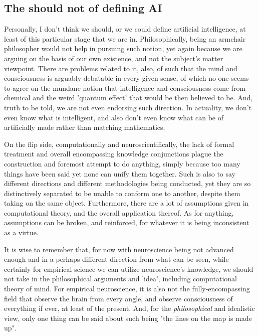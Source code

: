 \subsection{ The should not of defining AI}
Personally, I don't think we should, or we could define artificial intelligence, at least of this particular stage that we are in. Philosophically, being an armchair philosopher would not help in pursuing such notion, yet again because we are arguing on the basis of our own existence, and not the subject's matter viewpoint. There are problems related to it, also, of such that the mind and consciousness is arguably debatable in every given sense, of which no one seems to agree on the mundane notion that intelligence and consciousness come from chemical and the weird 'quantum effect' that would be then believed to be. And, truth to be told, we are not even endorsing such direction. In actuality, we don't even know what is intelligent, and also don't even know what can be of artificially made rather than matching mathematics. 

On the flip side, computationally and neuroscientifically, the lack of formal treatment and overall encompassing knowledge conjunctions plague the construction and foremost attempt to do anything, simply because too many things have been said yet none can unify them together. Such is also to say different directions and different methodologies being conducted, yet they are so distinctively separated to be unable to conform one to another, despite them taking on the same object. Furthermore, there are a lot of assumptions given in computational theory, and the overall application thereof. As for anything, assumptions can be broken, and reinforced, for whatever it is being inconsistent as a virtue. 

It is wise to remember that, for now with neuroscience being not advanced enough and in a perhaps different direction from what can be seen, while certainly for empirical science we can utilize neuroscience's knowledge, we should not take in the philosophical arguments and 'idea', including computational theory of mind. For empirical neuroscience, it is also not the fully-encompassing field that observe the brain from every angle, and observe consciousness of everything if ever, at least of the present. And, for the \textit{philosophical} and idealistic view, only one thing can be said about such being "the lines on the map is made up". 
